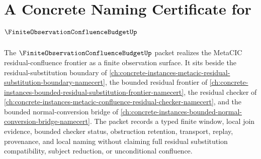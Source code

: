 \chapter{A Concrete Naming Certificate for $\FiniteObservationConfluenceBudgetUp$}
\label{ch:concrete-instances-finite-observation-confluence-budget-namecert}

The $\FiniteObservationConfluenceBudgetUp$ packet realizes the MetaCIC residual-confluence frontier as a finite observation surface. It sits beside the residual-substitution boundary of \autoref{ch:concrete-instances-metacic-residual-substitution-boundary-namecert}, the bounded residual frontier of \autoref{ch:concrete-instances-bounded-residual-substitution-frontier-namecert}, the residual checker of \autoref{ch:concrete-instances-metacic-confluence-residual-checker-namecert}, and the bounded normal-conversion bridge of \autoref{ch:concrete-instances-bounded-normal-conversion-bridge-namecert}. The packet records a typed finite window, local join evidence, bounded checker status, obstruction retention, transport, replay, provenance, and local naming without claiming full residual substitution compatibility, subject reduction, or unconditional confluence.

